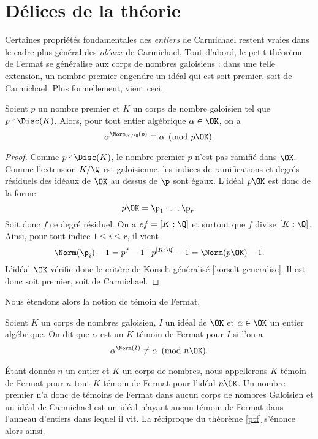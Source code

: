 \section{Délices de la théorie}

Certaines propriétés fondamentales des \emph{entiers} de Carmichael restent vraies dans le cadre plus général des \emph{idéaux} de Carmichael. Tout d'abord, le petit théorème de Fermat se généralise aux corps de nombres galoisiens : dans une telle extension, un nombre premier engendre un idéal qui est soit premier, soit de Carmichael. Plus formellement, vient ceci.

\begin{theoreme}\label{ptf}
	Soient $p$ un nombre premier et $K$ un corps de nombre galoisien tel que $p\nmid \Disc(K)$. Alors, pour tout entier algébrique $\alpha \in \OK$, on a $$\alpha^{\Norm_{K/\Q}(p)} \equiv \alpha \pmod{p\OK}.$$
\end{theoreme}

\begin{proof}
	Comme $p\nmid \Disc(K)$, le nombre premier $p$ n'est pas ramifié dans $\OK$. Comme l'extension $K/\Q$ est galoisienne, les indices de ramifications et degrés résiduels des idéaux de $\OK$ au dessus de $\p$ sont égaux. L'idéal $p\OK$ est donc de la forme \[p\OK = \p_1\cdot \dots \p_r.\] Soit donc $f$ ce degré résiduel. On a $ef = [K : \Q]$ et surtout que $f$ divise $[ K : \Q ]$. Ainsi, pour tout indice $1\leq i \leq r$, il vient \[ \Norm(\p_i) - 1 = p^f - 1 \mid p^{[K : \Q]} - 1 = \Norm(p\OK) - 1.\] L'idéal $\OK$ vérifie donc le critère de Korselt généralisé \ref{korselt-generalise}. Il est donc soit premier, soit de Carmichael.
\end{proof}

Nous étendons alors la notion de témoin de Fermat.

\begin{definition}
	Soient $K$ un corps de nombres galoisien, $I$ un idéal de $\OK$ et $\alpha\in \OK$ un entier algébrique. On dit que $\alpha$ est un $K$-témoin de Fermat pour $I$ si l'on a \[\alpha^{\Norm(I)} \not \equiv \alpha \pmod{n\OK}.\]
\end{definition}

Étant donnés $n$ un entier et $K$ un corps de nombres, nous appellerons $K$-témoin de Fermat pour $n$ tout $K$-témoin de Fermat pour l'idéal $n\OK$. Un nombre premier n'a donc de témoins de Fermat dans aucun corps de nombres Galoisien et un idéal de Carmichael est un idéal n'ayant aucun témoin de Fermat dans l'anneau d'entiers dans lequel il vit. La réciproque du théorème \ref{ptf} s'énonce alors ainsi.

